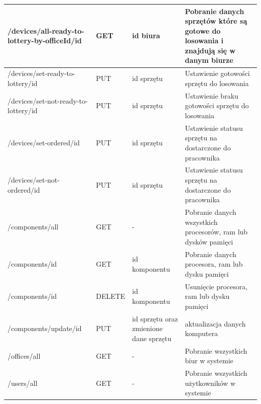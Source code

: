 \begin{table}[H]
\begin{tabularx}{\linewidth}{|X|l|p{3cm}|X|}
		/devices/all-ready-to-lottery-by-officeId/id& GET	& id biura & Pobranie danych sprzętów które są gotowe do losowania i znajdują się w danym biurze\\
    \hline
		/devices/set-ready-to-lottery/id 		& PUT	& id sprzętu & Ustawienie gotowości sprzętu do losowania	\\
    \hline
		/devices/set-not-ready-to-lottery/id & PUT	& id sprzętu & Ustawienie braku gotowości sprzętu do losowania	\\
    \hline
		/devices/set-ordered/id & PUT	& id sprzętu & Ustawienie statusu sprzętu na dostarczone	do pracownika	\\
    \hline
		/devices/set-not-ordered/id & PUT	& id sprzętu & Ustawienie statusu sprzętu na dostarczone	do pracownika	\\
    \hline
		/components/all 	& GET & - & Pobranie danych wszystkich procesorów, ram lub dysków pamięci \\
		\hline
		/components/{id} & GET & id komponentu 	& Pobranie danych procesora, ram lub dysku pamięci\\
    \hline
		/components/{id}	& DELETE & id komponentu 	& Usunięcie procesora, ram lub dysku pamięci\\
    \hline
		 /components/update/id & PUT & id sprzętu oraz zmienione dane sprzętu& aktualizacja danych komputera\\
		\hline
		 /offices/all	& GET & - & Pobranie wszystkich biur w systemie\\
		\hline
		/users/all	& GET & - & Pobranie wszystkich użytkowników w systemie\\
		\hline
		\end{tabularx}
		\end{table}

